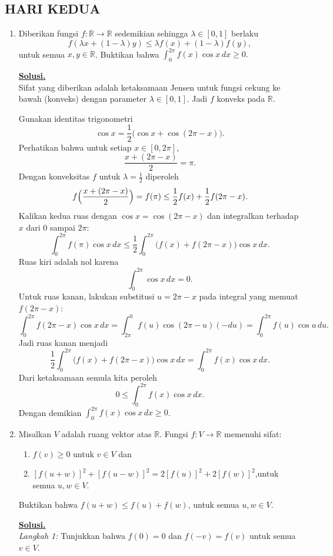 \documentclass[12pt,twoside]{article}
\newenvironment{solution}
{
	\par\noindent\textbf{\underline{Solusi.}}\\
}
{
	\par
}
\begin{document}
\subsection{HARI KEDUA}
\begin{enumerate}
  \item Diberikan fungsi $f:\mathbb{R}\to \mathbb{R}$ sedemikian  sehingga $\lambda\in[0,1]$ berlaku
        $$f(\lambda x+(1-\lambda)y)\leq \lambda f(x)+(1-\lambda)f(y),$$ untuk semua $x,y\in \mathbb{R}$. Buktikan bahwa
        $\displaystyle\int_{0}^{2\pi}f(x)\cos x\,dx\geq 0.$
        \begin{solution}
          Sifat yang diberikan adalah ketaksamaan Jensen untuk fungsi cekung ke bawah (konveks) dengan parameter $\lambda\in[0,1]$. Jadi $f$ konveks pada $\mathbb R$.

          Gunakan identitas trigonometri
          \[
            \cos x = \frac{1}{2}\bigl(\cos x+\cos(2\pi-x)\bigr).
          \]
          Perhatikan bahwa untuk setiap $x\in[0,2\pi]$,
          \[
            \frac{x+(2\pi-x)}{2}=\pi.
          \]
          Dengan konveksitas $f$ untuk $\lambda=\tfrac12$ diperoleh
          \[
            f\Bigl(\frac{x+(2\pi-x)}{2}\Bigr) = f(\pi)\le \frac12 f(x)+\frac12 f(2\pi-x).
          \]
          Kalikan kedua ruas dengan $\cos x=\cos(2\pi-x)$ dan integralkan terhadap $x$ dari $0$ sampai $2\pi$:
          \[
            \int_0^{2\pi} f(\pi)\cos x\,dx \le \frac12\int_0^{2\pi}\bigl(f(x)+f(2\pi-x)\bigr)\cos x\,dx.
          \]
          Ruas kiri adalah nol karena
          \[
            \int_0^{2\pi}\cos x\,dx = 0.
          \]
          Untuk ruas kanan, lakukan substitusi $u=2\pi-x$ pada integral yang memuat $f(2\pi-x)$:
          \[
            \int_0^{2\pi} f(2\pi-x)\cos x\,dx = \int_{2\pi}^0 f(u)\cos(2\pi-u)(-du)=\int_0^{2\pi} f(u)\cos u\,du.
          \]
          Jadi ruas kanan menjadi
          \[
            \frac12\int_0^{2\pi}\bigl(f(x)+f(2\pi-x)\bigr)\cos x\,dx=\int_0^{2\pi} f(x)\cos x\,dx.
          \]
          Dari ketaksamaan semula kita peroleh
          \[
            0 \le \int_0^{2\pi} f(x)\cos x\,dx.
          \]
          Dengan demikian $\displaystyle\int_0^{2\pi} f(x)\cos x\,dx\ge0$.
        \end{solution}

  \item Misalkan $V$ adalah ruang vektor atas $\mathbb{R}$. Fungsi $f:V\to\mathbb{R}$ memenuhi sifat:
        \begin{enumerate}
          \item [(a)] $f(v)\geq 0$ untuk $v\in V$ dan
          \item[(b)]$\left[f(u+w)\right]^2+\left[f(u-w)\right]^2=2\left[f(u)\right]^2+2\left[f(w)\right]^2$,untuk semua $u,w\in V$.
        \end{enumerate}
        Buktikan bahwa $f(u+w)\leq f(u)+f(w)$, untuk semua $u,w\in V$.
        \begin{solution}
          \textit{Langkah 1:} Tunjukkan bahwa $f(0)=0$ dan $f(-v)=f(v)$ untuk semua $v\in V$.


\end{solution}
\end{enumerate}
\end{document}
